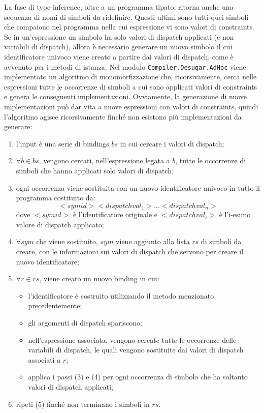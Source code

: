 \documentclass[10pt,a4paper]{article}
\begin{document}
La fase di type-inference, oltre a un programma tipato, ritorna anche una sequenza di nomi di simboli da ridefinire.
Questi ultimi sono tutti quei simboli che compaiono nel programma nella cui espressione vi sono valori di constraints.
Se in un'espressione un simbolo ha solo valori di dispatch applicati (e non variabili di dispatch), allora è necessario
generare un nuovo simbolo il cui identificatore univoco viene creato a partire dai valori di dispatch, come è avvenuto
per i metodi di istanza.
Nel modulo \texttt{Compiler.Desugar.AdHoc} viene implementato un algoritmo di monomorfizzazione che, ricorsivamente,
cerca nelle espressioni tutte le occorrenze di simboli a cui sono applicati valori di constraints e
genera le conseguenti implementazioni.
Ovviamente, la generazione di nuove implementazioni può dar vita a nuove espressioni con valori di constraints,
quindi l'algoritmo agisce ricorsivamente finché non esistono più implementazioni da generare:
\begin{enumerate}
    \item l'input è una serie di bindings $ bs $ in cui cercare i valori di dispatch;
    \item $ \forall b \in bs $, vengono cercati, nell'espressione legata a $ b $, tutte le occorrenze di simboli che
    hanno applicati solo valori di dispatch;
    \item ogni occorrenza viene sostituita con un nuovo identificatore univoco in tutto il programma costituito da:
        \[<symid><dispatchval_1>...<dispatchval_n>\]
    dove $ <symid> $ è l'identificatore originale e $ <dispatchval_i> $ è l'i-esimo valore di dispatch applicato;
    \item $ \forall sym $ che viene sostituito, $ sym $ viene aggiunto alla lista $ rs $ di simboli da creare, con le
    informazioni sui valori di dispatch che servono per creare il nuovo identificatore;
    \item $ \forall r \in rs $, viene creato un nuovo binding in cui:
    \begin{itemize}
        \item l'identificatore è costruito utilizzando il metodo menzionato precedentemente;
        \item gli argomenti di dispatch spariscono;
        \item nell'espressione associata, vengono cercate tutte le occorrenze delle variabili di dispatch, le quali
        vengono sostituite dai valori di dispatch associati a $ r $;
        \item applica i passi (3) e (4) per ogni occorrenza di simbolo che ha soltanto valori di dispatch applicati;
    \end{itemize}
    \item ripeti (5) finché non terminano i simboli in $ rs $.
\end{enumerate}
\end{document}
